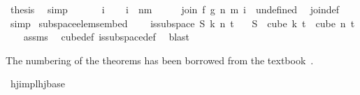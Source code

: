 \begin{isabellebody}
\ {\isacharquery}{\kern0pt}thesis\ \isamarkupfalse%
\ simp\isanewline
\ \ \isamarkupfalse%
\isanewline
{}\isamarkupfalse%
\isanewline
\ \ \isamarkupfalse%
\ i\isanewline
\ \ \isamarkupfalse%
\ {\isachardoublequoteopen}i\ {\isasymnotin}\ {\isacharbraceleft}{\kern0pt}{\isachardot}{\kern0pt}{\isachardot}{\kern0pt}{\isacharless}{\kern0pt}n{\isacharplus}{\kern0pt}m{\isacharbraceright}{\kern0pt}{\isachardoublequoteclose}\isanewline
\ \ \isamarkupfalse%
\ \isamarkupfalse%
\ {\isachardoublequoteopen}join\ f\ g\ n\ m\ i\ {\isacharequal}{\kern0pt}\ undefined{\isachardoublequoteclose}\ \isamarkupfalse%
\ join{\isacharunderscore}{\kern0pt}def\ \isamarkupfalse%
\ simp\isanewline
{}\isamarkupfalse%
%
\endisatagproof
{\isafoldproof}%
%
\isadelimproof
\isanewline
%
\endisadelimproof
\isanewline
{}\isamarkupfalse%
\ subspace{\isacharunderscore}{\kern0pt}elems{\isacharunderscore}{\kern0pt}embed{\isacharcolon}{\kern0pt}\ \isanewline
\ \ \ {\isachardoublequoteopen}is{\isacharunderscore}{\kern0pt}subspace\ S\ k\ n\ t{\isachardoublequoteclose}\isanewline
\ \ \ {\isachardoublequoteopen}S\ {\isacharbackquote}{\kern0pt}\ {\isacharparenleft}{\kern0pt}cube\ k\ t{\isacharparenright}{\kern0pt}\ {\isasymsubseteq}\ cube\ n\ t{\isachardoublequoteclose}\isanewline
%
\isadelimproof
\ \ %
\endisadelimproof
%
\isatagproof
{}\isamarkupfalse%
\ assms\ \isamarkupfalse%
\ cube{\isacharunderscore}{\kern0pt}def\ is{\isacharunderscore}{\kern0pt}subspace{\isacharunderscore}{\kern0pt}def\ \isamarkupfalse%
\ blast%
\endisatagproof
{\isafoldproof}%
%
\isadelimproof
%
\endisadelimproof
%
\isadelimdocument
%
\endisadelimdocument
%
\isatagdocument
%
\isamarkuptrue%
%
\endisatagdocument
{\isafolddocument}%
%
\isadelimdocument
%
\endisadelimdocument
%
\begin{isamarkuptext}%
The numbering of the theorems has been borrowed from the textbook~\cite{thebook}.%
\end{isamarkuptext}\isamarkuptrue%
%
\isadelimdocument
%
\endisadelimdocument
%
\isatagdocument
%
\isamarkuptrue%
%
\isamarkuptrue%
%
\endisatagdocument
{\isafolddocument}%
%
\isadelimdocument
%
\endisadelimdocument
{}\isamarkupfalse%
\ hj{\isacharunderscore}{\kern0pt}imp{\isacharunderscore}{\kern0pt}lhj{\isacharunderscore}{\kern0pt}base{\isacharcolon}{\kern0pt}\ \isanewline

\end{isabellebody}
